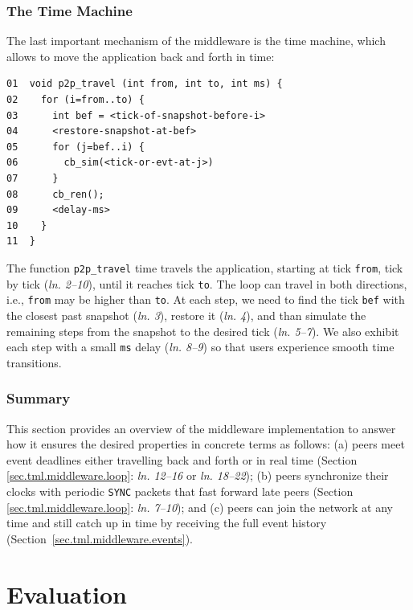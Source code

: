 \documentclass[12pt]{article}
\newcommand{\code}[1]  {\texttt{\small{#1}}}
\newcommand{\lin}[1]{(\emph{ln. #1}\xspace)}
\newcommand{\linx}[1]{\emph{ln. #1}\xspace}
\begin{document}
\subsubsection{The Time Machine}
\label{sec.tml.middleware.travel}

The last important mechanism of the middleware is the time machine, which
allows to move the application back and forth in time:

{\footnotesize
\begin{verbatim}
01  void p2p_travel (int from, int to, int ms) {
02    for (i=from..to) {
03      int bef = <tick-of-snapshot-before-i>
04      <restore-snapshot-at-bef>
05      for (j=bef..i) {
06        cb_sim(<tick-or-evt-at-j>)
07      }
08      cb_ren();
09      <delay-ms>
10    }
11  }
\end{verbatim}
}

The function \code{p2p\_travel} time travels the application, starting at tick
\code{from}, tick by tick \lin{2--10}, until it reaches tick \code{to}.
The loop can travel in both directions, i.e., \code{from} may be higher than
\code{to}.
At each step, we need to find the tick \code{bef} with the closest past
snapshot \lin{3}, restore it \lin{4}, and than simulate the remaining steps
from the snapshot to the desired tick \lin{5--7}.
We also exhibit each step with a small \code{ms} delay \lin{8--9} so that users
experience smooth time transitions.

\subsubsection{Summary}
\label{sec.tml.middleware.summary}

This section provides an overview of the middleware implementation to answer
how it ensures the desired properties in concrete terms as follows:
    (a) peers meet event deadlines either travelling back and forth or in real
        time (Section \ref{sec.tml.middleware.loop}: \linx{12--16} or
        \linx{18--22});
    (b) peers synchronize their clocks with periodic \code{SYNC} packets that
        fast forward late peers (Section \ref{sec.tml.middleware.loop}:
        \linx{7--10}); and
    (c) peers can join the network at any time and still catch up in time by
        receiving the full event history
        (Section~\ref{sec.tml.middleware.events}).

\section{Evaluation}
\label{sec.eval}
\end{document}
